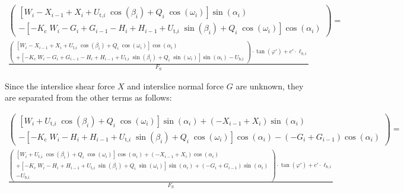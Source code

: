 \documentclass[12pt]{article}
\begin{document}
\begin{equation*}
\begin{array}{l} \left( \begin{array}{l} \left[
W_{i} -X_{i-1} + X_{i} +
{U_{\text{t,}i}}\;{\cos\left(\beta_{i}\right)} +
Q_{i}\;{\cos\left(\omega_{i}\right)}
\right]\sin\left(\alpha_{i}\right) \\ - \left[
{-K_{\text{c}}}\;{W_{i}} - G_{i} + G_{i-1}
- H_{i} + H_{i-1} +
{U_{\text{t,}i}}\;{\sin\left(\beta_{i}\right)} +
Q_{i}\;{\cos\left(\omega_{i}\right)}
\right]\cos\left(\alpha_{i}\right) \end{array} \right) =\\ \frac { 
	\left( \begin{array}{l}
	\left[ W_{i} - X_{i-1} + X_{i} +
	{U_{\text{t,}i}}\;{\cos\left(\beta_{i}\right)} +
	Q_{i}\;{\cos\left(\omega_{i}\right)}
	\right]\cos\left(\alpha_{i}\right) \\ + \left[
	{-K_{\text{c}}}\;{W_{i}} - G_{i} + G_{i-1} -
	H_{i} + H_{i-1} +
	{U_{\text{t,}i}}\;{\sin\left(\beta_{i}\right)} +
	Q_{i}\;{\sin\left(\omega_{i}\right)}
	\right]\sin\left(\alpha_{i}\right) -
	U_{\text{b,i}} \end{array} \right) \cdot \tan\left( \varphi'
	\right) + c' \cdot \ell_{b,i} }{F_\text{S}} \end{array}
\end{equation*}

\noindent Since the interslice shear force $X$ and interslice normal force $G$ 
are unknown, they are separated from the other terms as follows:

\begin{equation*}
\begin{array}{l} \left( \begin{array}{l} \left[
		W_{i} +
		{U_{\text{t,}i}}\;{\cos\left(\beta_{i}\right)} +
		Q_{i}\;{\cos\left(\omega_{i}\right)}
		\right]\sin\left(\alpha_{i}\right) + \left(-X_{i-1} + 
		X_{i}\right)\sin\left(\alpha_{i}\right)\\ - \left[
		{-K_{\text{c}}}\;{W_{i}}
		- H_{i} + H_{i-1} +
		{U_{\text{t,}i}}\;{\sin\left(\beta_{i}\right)} +
		Q_{i}\;{\cos\left(\omega_{i}\right)}
		\right]\cos\left(\alpha_{i}\right) - \left(- G_{i} + 
		G_{i-1}\right)\cos\left(\alpha_{i}\right) \end{array} 
		\right) =\\ \frac 
		{ 
		\left( \begin{array}{l}
			\left[ W_{i} +
			{U_{\text{t,}i}}\;{\cos\left(\beta_{i}\right)} +
			Q_{i}\;{\cos\left(\omega_{i}\right)}
			\right]\cos\left(\alpha_{i}\right) + \left(- X_{i-1} 
			+ X_{i}\right)\cos\left(\alpha_{i}\right) \\ + \left[
			{-K_{\text{c}}}\;{W_{i}} -
			H_{i} + H_{i-1} +
			{U_{\text{t,}i}}\;{\sin\left(\beta_{i}\right)} +
			Q_{i}\;{\sin\left(\omega_{i}\right)}
			\right]\sin\left(\alpha_{i}\right) + \left(- G_{i} + 
			G_{i-1}\right)\sin\left(\alpha_{i}\right)\\ -
			U_{\text{b,i}} \end{array} \right) \cdot \tan\left( 
			\varphi'
		\right) + c' \cdot \ell_{b,i} }{F_\text{S}} \end{array}
\end{equation*}
\end{document}
